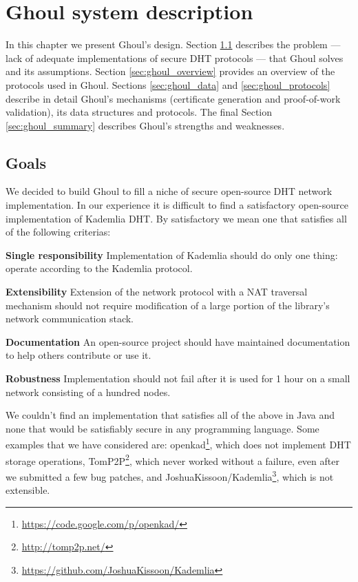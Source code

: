 \chapter{Ghoul system description}
\label{ch:description}

In this chapter we present Ghoul's design.
Section \ref{sec:ghoul_goals} describes the problem --- lack of adequate
implementations of secure DHT protocols --- that Ghoul solves and its
assumptions.
Section \ref{sec:ghoul_overview} provides an overview of the protocols used in
Ghoul.
Sections \ref{sec:ghoul_data} and \ref{sec:ghoul_protocols} describe in detail
Ghoul's mechanisms (certificate generation and proof-of-work validation), its
data structures and protocols.
The final Section \ref{sec:ghoul_summary} describes Ghoul's strengths and
weaknesses.

\section{Goals}
\label{sec:ghoul_goals}
We decided to build Ghoul to fill a niche of secure open-source DHT network
implementation. In our experience it is difficult to find a satisfactory
open-source implementation of Kademlia DHT. By satisfactory we mean one that
satisfies all of the following criterias:

\begin{description}
  \item{\textbf{Single responsibility}} Implementation of Kademlia should do
    only one thing: operate according to the Kademlia protocol.
  \item{\textbf{Extensibility}} Extension of the network protocol with a
    NAT traversal mechanism should not require modification of a large portion
    of the library's network communication stack.
  \item{\textbf{Documentation}} An open-source project should have maintained
    documentation to help others contribute or use it.
  \item{\textbf{Robustness}} Implementation should not fail after it is used
    for 1 hour on a small network consisting of a hundred nodes.
\end{description}

We couldn't find an implementation that satisfies all of the above in Java and
none that would be satisfiably secure in any programming language.
Some examples that we have considered are:
openkad\footnote{\url{https://code.google.com/p/openkad/}}, which does not
implement DHT storage operations, TomP2P\footnote{\url{http://tomp2p.net/}},
which never worked without a failure, even after we submitted a few bug patches,
and JoshuaKissoon/Kademlia\footnote{
\url{https://github.com/JoshuaKissoon/Kademlia}}, which is not extensible.

